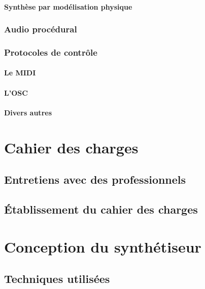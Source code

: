 ﻿\documentclass[12pt]{article}
\begin{document}
\paragraph{Synthèse par modélisation physique}

\subsubsection{Audio procédural}

\subsubsection{Protocoles de contrôle}

\paragraph{Le MIDI}
\paragraph{L'OSC}
\paragraph{Divers autres}

\newpage

\section{Cahier des charges}

\subsection{Entretiens avec des professionnels}

\subsection{Établissement du cahier des charges}

\newpage

\section{Conception du synthétiseur}

\subsection{Techniques utilisées}
\end{document}

